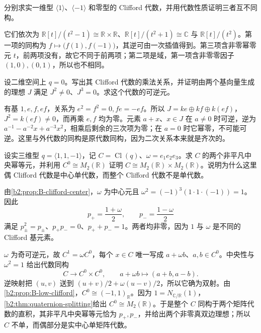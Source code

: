 \BookExercises

\begin{exercise}\label{b2:ex:B-one-dimensional-clifford}
	分别求实一维型 \(\langle1\rangle\)、\(\langle-1\rangle\) 和零型的 Clifford 代数，并用代数性质证明三者互不同构。
\end{exercise}
\begin{solution}
	它们依次为 \(\mathbb R[t]/(t^2-1)\cong\mathbb R\times\mathbb R\)、\(\mathbb R[t]/(t^2+1)\cong\mathbb C\) 与 \(\mathbb R[t]/(t^2)\)。第一项的同构为 \(f\mapsto\bigl(f(1),f(-1)\bigr)\)，其逆可由一次插值得到。第三项含非零幂零元 \(t\)，前两项没有，故它不同于前两项；第二项是域，第一项含非零零因子 \((1,0),(0,1)\)，所以也不相同。
\end{solution}

\begin{exercise}\label{b2:ex:B-zero-clifford-radical}
	设二维空间上 \(q=0\)。写出其 Clifford 代数的乘法关系，并证明由两个基向量生成的理想 \(J\) 满足 \(J^2\ne0\)、\(J^3=0\)。求这个代数的可逆元。
\end{exercise}
\begin{solution}
	有基 \(1,e,f,ef\)，关系为 \(e^2=f^2=0,fe=-ef\)。所以 \(J=ke\oplus kf\oplus k(ef)\)，\(J^2=k(ef)\ne0\)，而再乘 \(e,f\) 均为零。元素 \(a+x\)、\(x\in J\) 在 \(a\ne0\) 时可逆，逆为 \(a^{-1}-a^{-2}x+a^{-3}x^2\)，相乘后剩余的三次项为零；在 \(a=0\) 时它幂零，不可能可逆。这里与外代数的同构是原代数同构，因为二次关系本来就是齐次的。
\end{solution}

\begin{exercise}\label{b2:ex:B-clifford-volume-center}
	设实三维型 \(q=\langle1,1,-1\rangle\)，记 \(C=\operatorname{Cl}(q)\)、\(\omega=e_1e_2e_3\)。求 \(C\) 的两个非平凡中央幂等元，并利用 \(C^0\cong M_2(\mathbb R)\) 证明 \(C\cong M_2(\mathbb R)\times M_2(\mathbb R)\)。说明为什么这里偶 Clifford 代数是中心单代数，而整个 Clifford 代数不是单代数。
\end{exercise}
\begin{solution}
	由\cref{b2:prop:B-clifford-center}，\(\omega\) 为中心元且 \(\omega^2=(-1)^3(1\cdot1\cdot(-1))=1\)。因此
	\[
		p_+=\frac{1+\omega}{2},\qquad p_-=\frac{1-\omega}{2}
	\]
	满足 \(p_\pm^2=p_\pm\)、\(p_+p_-=0\)、\(p_++p_-=1\)。两者均非零，因为 \(1\) 与 \(\omega\) 是不同的 Clifford 基元素。

	\(\omega\) 为奇可逆元，故 \(C^1=\omega C^0\)，每个 \(x\in C\) 唯一写成 \(a+\omega b\)、\(a,b\in C^0\)。中央性与 \(\omega^2=1\) 给出代数同构
	\[
		C\longrightarrow C^0\times C^0,\qquad a+\omega b\longmapsto(a+b,a-b).
	\]
	逆映射把 \((u,v)\) 送到 \((u+v)/2+\omega(u-v)/2\)，所以它确为双射。由\cref{b2:prop:B-low-clifford}，\(C^0\cong(-1,1)_{\mathbb R}\)。因为 \(1=N_{\mathbb C/\mathbb R}(1)\)，\cref{b2:thm:quaternion-splitting}给出 \(C^0\cong M_2(\mathbb R)\)。于是整个 \(C\) 同构于两个矩阵代数的直积，其非平凡中央幂等元恰为 \(p_+,p_-\)，并给出两个非零真双边理想；所以 \(C\) 不单，而偶部分是实中心单矩阵代数。
\end{solution}

